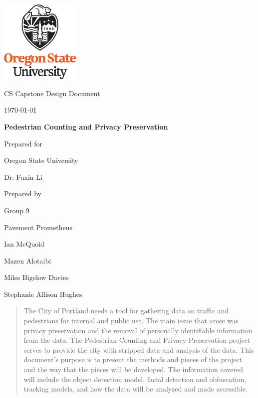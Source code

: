 \documentclass[onecolumn, draftclsnofoot,10pt, compsoc]{IEEEtran}
\def \CapstoneTeamName{		Pavement Prometheus}
\def \CapstoneTeamNumber{		9}
\def \GroupMemberOne{			Ian McQuoid  }
\def \GroupMemberTwo{			Mazen Alotaibi }
\def \GroupMemberThree{			Miles Bigelow Davies  }
\def \GroupMemberFour{			Stephanie Allison Hughes }
\def \CapstoneProjectName{		Pedestrian Counting and Privacy Preservation}
\def \CapstoneSponsorCompany{	Oregon State University}
\def \CapstoneSponsorPerson{		Dr. Fuxin Li}
\def \DocType{		%
				Design Document
				}
\newcommand{\NameSigPair}[1]{\par
\makebox[2.75in][r]{#1} \hfil 	\makebox[3.25in]{\makebox[2.25in]{\hrulefill} \hfill		\makebox[.75in]{\hrulefill}}
\par\vspace{-12pt} \textit{\tiny\noindent
\makebox[2.75in]{} \hfil		\makebox[3.25in]{\makebox[2.25in][r]{Signature} \hfill	\makebox[.75in][r]{Date}}}}
\renewcommand{\NameSigPair}[1]{#1}
\begin{document}
\begin{titlepage}
    \begin{singlespace}
    	\includegraphics[height=4cm]{images/coe_v_spot1}
        \hfill 
        \par\vspace{.2in}
        \centering
        \scshape{
            \huge CS Capstone \DocType \par
            {\large\today}\par
            \vspace{.5in}
            \textbf{\Huge\CapstoneProjectName}\par
            {\large Prepared for}\par
            \Huge \CapstoneSponsorCompany\par
            \vspace{5pt}
            {\Large\NameSigPair{\CapstoneSponsorPerson}\par}
            {\large Prepared by }\par
            Group\CapstoneTeamNumber\par
            \CapstoneTeamName\par 
            \vspace{5pt}
            {\Large
                \NameSigPair{\GroupMemberOne}\par
                \NameSigPair{\GroupMemberTwo}\par
                \NameSigPair{\GroupMemberThree}\par
                \NameSigPair{\GroupMemberFour}\par
            }
            \vspace{20pt}
        }
        \begin{abstract}
        The City of Portland needs a tool for gathering data on traffic and pedestrians for internal and public use. The main issue that arose was privacy preservation and the removal of personally identifiable information from the data. The Pedestrian Counting and Privacy Preservation project serves to provide the city with stripped data and analysis of the data. This document's purpose is to present the methods and pieces of the project and the way that the pieces will be developed. The information covered will include the object detection model, facial detection and obfuscation, tracking models, and how the data will be analyzed and made accessible. 
        \end{abstract}     
    \end{singlespace}
\end{titlepage}
\end{document}
